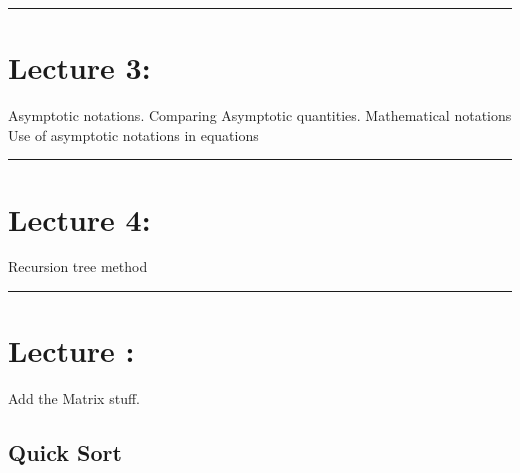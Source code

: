 \documentclass{article}
\begin{document}
\begin{center}
	\rule{450pt}{1pt} 
\end{center}
\newpage

\section*{Lecture 3:}

Asymptotic notations. Comparing Asymptotic quantities.
Mathematical notations
Use of asymptotic notations in equations



\begin{center}
	\rule{450pt}{1pt} 
\end{center}
\newpage

\section*{Lecture 4:}

Recursion tree method

\begin{center}
	\rule{450pt}{1pt} 
\end{center}
\newpage

\section*{Lecture :}

Add the Matrix stuff.\\

\subsection*{Quick Sort}
\end{document}
